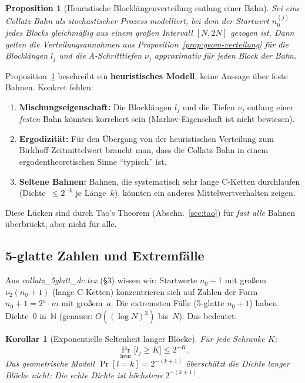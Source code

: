 \documentclass[12pt,a4paper]{article}
\newtheorem{proposition}[definition]{Proposition}
\newtheorem{korollar}[definition]{Korollar}
\newcommand{\vii}{\nu_2}
\newcommand{\N}{\mathbb{N}}
\begin{document}
\begin{proposition}[Heuristische Blocklängenverteilung entlang einer Bahn]
\label{prop:bahn-verteilung}
Sei eine Collatz-Bahn als stochastischer Prozess modelliert, bei dem der
Startwert $n_0^{(j)}$ jedes Blocks gleichmäßig aus einem großen Intervall
$[N, 2N]$ gezogen ist. Dann gelten die Verteilungsannahmen aus
Proposition~\ref{prop:geom-verteilung} für die Blocklängen $l_j$ und
die A-Schritttiefen $\nu_j$ approximativ für \emph{jeden Block} der Bahn.
\end{proposition}

\begin{tcolorbox}[warnung, title={Präzise Grenze des Dichtearguments}]
Proposition~\ref{prop:bahn-verteilung} beschreibt ein \textbf{heuristisches Modell},
keine Aussage über feste Bahnen. Konkret fehlen:

\begin{enumerate}[label=(\alph*), leftmargin=*]
  \item \textbf{Mischungseigenschaft:} Die Blocklängen $l_j$ und die Tiefen
    $\nu_j$ entlang einer \emph{festen} Bahn könnten korreliert sein
    (Markov-Eigenschaft ist nicht bewiesen).
  \item \textbf{Ergodizität:} Für den Übergang von der heuristischen
    Verteilung zum Birkhoff-Zeitmittelwert braucht man, dass die Collatz-Bahn
    in einem ergodentheoretischen Sinne ``typisch'' ist.
  \item \textbf{Seltene Bahnen:} Bahnen, die systematisch sehr lange
    C-Ketten durchlaufen (Dichte~$\leq 2^{-k}$ je Länge~$k$), könnten
    ein anderes Mittelwertverhalten zeigen.
\end{enumerate}

Diese Lücken sind durch Tao's Theorem (Abschn.~\ref{sec:tao}) für
\emph{fast alle} Bahnen überbrückt, aber nicht für alle.
\end{tcolorbox}

\subsection{5-glatte Zahlen und Extremfälle}

Aus \textit{collatz\_5glatt\_dc.tex} (§3) wissen wir: Startwerte $n_0+1$
mit großem $\vii(n_0+1)$ (lange C-Ketten) konzentrieren sich auf Zahlen
der Form $n_0+1 = 2^a \cdot m$ mit großem~$a$. Die extremsten Fälle
(5-glatte $n_0+1$) haben Dichte~$0$ in~$\N$ (genauer: $O((\log N)^3)$
bis~$N$). Das bedeutet:

\begin{korollar}[Exponentielle Seltenheit langer Blöcke]
\label{kor:seltenheit}
Für jede Schranke $K$:
\[
  \Pr_{\text{heur}}\bigl[l_j \geq K\bigr] \leq 2^{-K}.
\]
Das geometrische Modell $\Pr[l=k] = 2^{-(k+1)}$ überschätzt die Dichte
langer Blöcke \emph{nicht}: Die echte Dichte ist höchstens $2^{-(k+1)}$.
\end{korollar}
\end{document}
